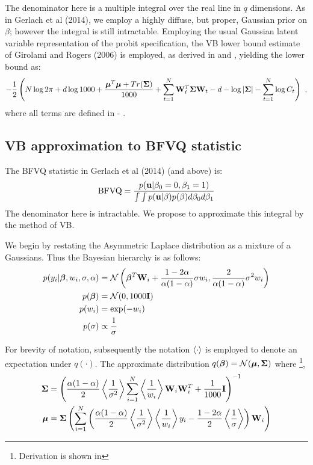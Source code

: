 \documentclass[12pt,epsf]{article}
\begin{document}
The denominator here is a multiple integral over the real line in $q$ dimensions. As in Gerlach et al (2014), we
employ a highly diffuse, but proper, Gaussian prior on $\beta$; however the integral is still intractable. Employing the
usual Gaussian latent variable representation of the probit specification, the VB lower bound
estimate of Girolami and Rogers (2006) is employed, as derived in  and , yielding
the lower bound as:
\begin{align}
-\frac{1}{2}\left(N\log 2\pi+d\log1000+\frac{{\boldsymbol{\mu}}^T{\boldsymbol{\mu}}+Tr({\mathbf{\Sigma}})}{1000}+
\sum_{t=1}^{N}\mathbf{W}_t^T{\mathbf{\Sigma}}\mathbf{W}_t-d-\log|{\mathbf{\Sigma}}|-\sum_{t=1}^{N}\log C_t\right) \,\, ,
\end{align}
where all terms are defined in  - .

\subsection{VB approximation to BFVQ statistic}
\label{sec:vb_derivation}
The BFVQ statistic in Gerlach et al (2014) (and above) is:
$$
\mbox{BFVQ} = \frac{ p({\bf u}|\beta_0=0, \beta_1=1)}{ \int \int p({\bf u}|\beta) p(\beta) d \beta_0 d \beta_1 }
$$
The denominator here is intractable. We propose to approximate this integral by the method of VB.

We begin by restating the Asymmetric Laplace distribution as a mixture of a Gaussians. Thus the Bayesian hierarchy is as follows:
\begin{align}
\nonumber p(y_i|\bm{\beta},w_i,\sigma,\alpha)&={\mathcal{N}}\left(\bm{\beta}^T\mathbf{W}_i+\frac{1-2\alpha}{\alpha(1-\alpha)}\sigma w_i,
\frac{2}{\alpha(1-\alpha)}\sigma^2 w_i\right)\\
\nonumber p(\bm{\beta})&={\mathcal{N}}(0,1000\mathbf{I})\\
\nonumber p(w_i)&=\exp(-w_i)\\
p(\sigma)&\propto\frac{1}{\sigma}
\label{eq:BFVQ_hier}
\end{align}

For brevity of notation, subsequently the notation $\left\langle\cdot\right\rangle$ is employed to denote an expectation under $q(\cdot)$.
The approximate distribution $q(\bm{\beta})={\mathcal{N}}({\boldsymbol{\mu}},{\mathbf{\Sigma}})$ where \footnote{Derivation is shown in },
\begin{align}
{\mathbf{\Sigma}} &=\left(\frac{\alpha(1-\alpha)}{2}\left\langle\frac{1}{\sigma^2}\right\rangle\sum_{i=1}^{N}\left\langle\frac{1}{w_i}\right\rangle\mathbf{W}_i\mathbf{W}_i^T+\frac{1}{1000}\mathbf{I}\right)^{-1}\\
{\boldsymbol{\mu}}&={\mathbf{\Sigma}}\left(\sum_{i=1}^{N}\left(\frac{\alpha(1-\alpha)}{2}\left\langle\frac{1}{\sigma^2}\right\rangle\left\langle\frac{1}{w_i}\right\rangle y_i-\frac{1-2\alpha}{2}\left\langle\frac{1}{\sigma}\right\rangle\right)\mathbf{W}_i\right)
\end{align}
\end{document}
